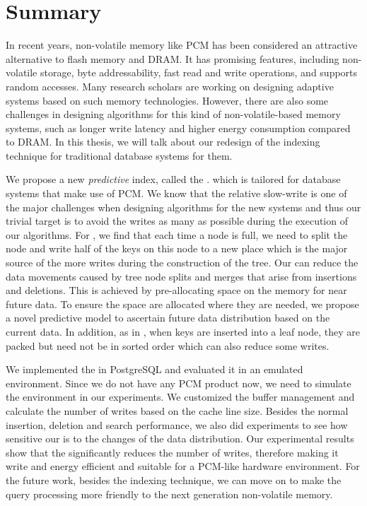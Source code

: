 \chapter*{Summary}


In recent years, non-volatile memory like PCM has
been considered an attractive
alternative to flash memory and DRAM. 
It has promising features, including non-volatile storage,
byte addressability, fast read and write operations,
and supports random accesses. Many research scholars are working on designing adaptive systems based on such memory technologies. 
However, there are also some challenges
in designing algorithms for this kind of non-volatile-based memory systems,
such as longer write latency and
higher energy consumption compared to DRAM.
In this thesis, we will talk about our redesign of the indexing technique for traditional database systems for them.

We propose a new {\em predictive} \bplustree index, called the \bptree.
which is tailored for database systems that make use of PCM.
We know that the relative slow-write is one of the major challenges when designing algorithms for the new systems and thus 
our trivial target is to avoid the writes as many as possible during the execution of our algorithms. 
For \bplustree, we find that each time a node is full, we need to split the node and 
write half of the keys on this node to a new place which is the major source of the more writes during the construction of the tree. 
Our \bptree can reduce the data movements caused by tree node
splits and merges that arise from insertions and deletions.
This is achieved by pre-allocating space on the memory for near future data.
To ensure the space are allocated where they are needed,
we propose a novel predictive model
to ascertain future data distribution based on the current data.
In addition, as in \cite{chen2011rethinking},
when keys are inserted into a leaf node,
they are packed but need not be in sorted order which can also reduce some writes.

We implemented the \bptree
in PostgreSQL and evaluated it in an emulated environment.
Since we do not have any PCM product now, we need to simulate the environment in our experiments. 
We customized the buffer management and calculate the number of writes based on the cache line size. 
Besides the normal insertion, deletion and search performance, we also did experiments to see how sensitive
our \bptree is to the changes of the data distribution. 
Our experimental results show that the \bptree significantly reduces
the number of writes,
therefore making it write and energy efficient and suitable for a PCM-like
hardware environment. For the future work, besides the indexing technique, we can move on to make the query
processing more friendly to the next generation non-volatile memory.
